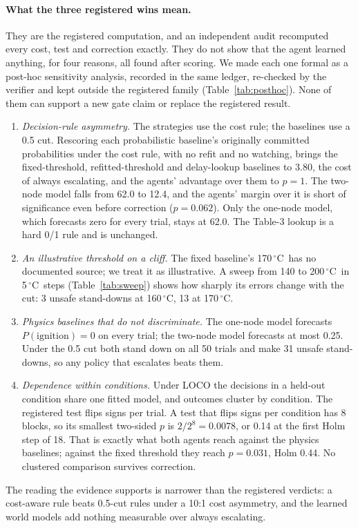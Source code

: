 \documentclass[11pt]{article}
\newcommand{\degC}{\,$^\circ$C}
\begin{document}
\paragraph{What the three registered wins mean.} They are the registered computation, and an independent audit
recomputed every cost, test and correction exactly. They do not show that the agent learned anything, for four
reasons, all found after scoring. We made each one formal as a post-hoc sensitivity analysis, recorded in the same
ledger, re-checked by the verifier and kept outside the registered family (Table~\ref{tab:posthoc}). None of them
can support a new gate claim or replace the registered result.
\begin{enumerate}
  \item \emph{Decision-rule asymmetry.} The strategies use the cost rule; the baselines use a 0.5 cut. Rescoring each
  probabilistic baseline's originally committed probabilities under the cost rule, with no refit and no watching,
  brings the fixed-threshold, refitted-threshold and delay-lookup baselines to 3.80, the cost of always escalating,
  and the agents' advantage over them to $p = 1$. The two-node model falls from 62.0 to 12.4, and the agents' margin
  over it is short of significance even before correction ($p = 0.062$). Only the one-node model, which forecasts zero
  for every trial, stays at 62.0. The Table-3 lookup is a hard 0/1 rule and is unchanged.
  \item \emph{An illustrative threshold on a cliff.} The fixed baseline's 170\degC\ has no documented source; we treat
  it as illustrative. A sweep from 140 to 200\degC\ in 5\degC\ steps (Table~\ref{tab:sweep}) shows how sharply its
  errors change with the cut: 3 unsafe stand-downs at 160\degC, 13 at 170\degC.
  \item \emph{Physics baselines that do not discriminate.} The one-node model forecasts $P(\text{ignition}) = 0$ on
  every trial; the two-node model forecasts at most 0.25. Under the 0.5 cut both stand down on all 50 trials and make
  31 unsafe stand-downs, so any policy that escalates beats them.
  \item \emph{Dependence within conditions.} Under LOCO the decisions in a held-out condition share one fitted model,
  and outcomes cluster by condition. The registered test flips signs per trial. A test that flips signs per
  condition has 8 blocks, so its smallest two-sided $p$ is $2/2^8 = 0.0078$, or 0.14 at the first Holm step of 18.
  That is exactly what both agents reach against the physics baselines; against the fixed threshold they reach
  $p = 0.031$, Holm 0.44. No clustered comparison survives correction.
\end{enumerate}
The reading the evidence supports is narrower than the registered verdicts: a cost-aware rule beats 0.5-cut rules
under a 10:1 cost asymmetry, and the learned world models add nothing measurable over always escalating.
\end{document}
